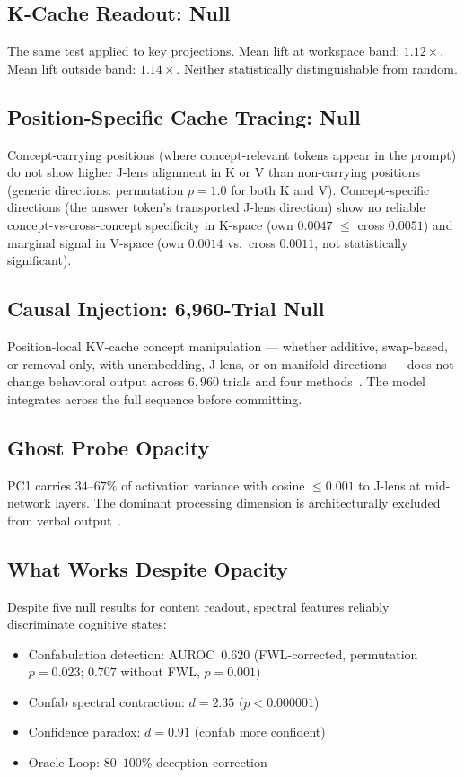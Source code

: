 \documentclass[11pt,a4paper]{article}
\begin{document}
\subsection{K-Cache Readout: Null}

The same test applied to key projections. Mean lift at workspace band:
$1.12\times$. Mean lift outside band: $1.14\times$. Neither
statistically distinguishable from random.

\subsection{Position-Specific Cache Tracing: Null}

Concept-carrying positions (where concept-relevant tokens appear in
the prompt) do not show higher J-lens alignment in K or V than
non-carrying positions (generic directions: permutation $p{=}1.0$
for both K and V). Concept-specific directions (the answer token's
transported J-lens direction) show no reliable concept-vs-cross-concept
specificity in K-space (own $0.0047$ $\leq$ cross $0.0051$) and
marginal signal in V-space (own $0.0014$ vs.\ cross $0.0011$, not
statistically significant).

\subsection{Causal Injection: 6,960-Trial Null}

Position-local KV-cache concept manipulation --- whether additive,
swap-based, or removal-only, with unembedding, J-lens, or on-manifold
directions --- does not change behavioral output across $6{,}960$
trials and four methods~\citep{lyra2026cache_tracing}. The model
integrates across the full sequence before committing.

\subsection{Ghost Probe Opacity}

PC1 carries $34$--$67\%$ of activation variance with cosine
${\leq}0.001$ to J-lens at mid-network layers. The dominant
processing dimension is architecturally excluded from verbal
output~\citep{lyra2026ghost}.

\subsection{What Works Despite Opacity}

Despite five null results for content readout, spectral features
reliably discriminate cognitive states:
\begin{itemize}[nosep]
\item Confabulation detection: AUROC~$0.620$ (FWL-corrected,
  permutation $p{=}0.023$; $0.707$ without FWL, $p{=}0.001$)
\item Confab spectral contraction: $d{=}2.35$ ($p{<}0.000001$)
\item Confidence paradox: $d{=}0.91$ (confab more confident)
\item Oracle Loop: $80$--$100\%$ deception correction
\end{itemize}
\end{document}
